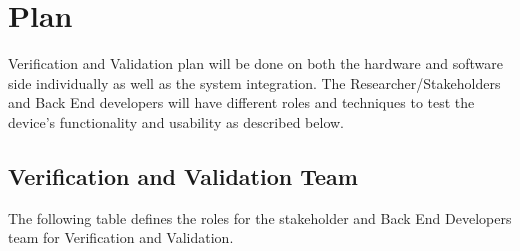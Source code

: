 \documentclass[12pt, titlepage]{article}
\begin{document}
\section{Plan}

Verification and Validation plan will be done on both the hardware and software side individually as well as the system integration. The Researcher/Stakeholders and Back End developers will have different roles and techniques to test the device's functionality and usability as described below.

\subsection{Verification and Validation Team}

The following table defines the roles for the stakeholder and Back End Developers team for Verification and Validation.
\end{document}
